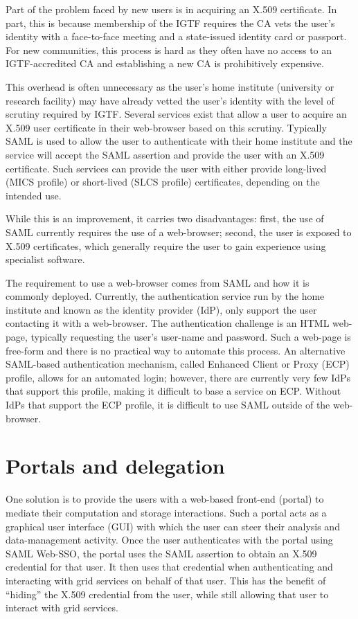 \documentclass[a4paper]{jpconf}
\begin{document}
Part of the problem faced by new users is in acquiring an X.509
certificate.  In part, this is because membership of the IGTF requires
the CA vets the user's identity with a face-to-face meeting and a
state-issued identity card or passport.  For new communities, this
process is hard as they often have no access to an IGTF-accredited CA
and establishing a new CA is prohibitively expensive.

This overhead is often unnecessary as the user's home institute
(university or research facility) may have already vetted the user's
identity with the level of scrutiny required by IGTF.  Several
services exist\cite{cilogon}\cite{tcs}\cite{dfn-aai} that allow a user
to acquire an X.509 user certificate in their web-browser based on
this scrutiny.  Typically SAML is used to allow the user to
authenticate with their home institute and the service will accept the
SAML assertion and provide the user with an X.509 certificate.  Such
services can provide the user with either provide long-lived (MICS
profile) or short-lived (SLCS profile) certificates, depending on the
intended use.

While this is an improvement, it carries two disadvantages: first, the
use of SAML currently requires the use of a web-browser; second, the
user is exposed to X.509 certificates, which generally require the
user to gain experience using specialist software.

The requirement to use a web-browser comes from SAML and how it is
commonly deployed.  Currently, the authentication service run by the
home institute and known as the identity provider (IdP), only support
the user contacting it with a web-browser.  The authentication
challenge is an HTML web-page, typically requesting the user's
user-name and password.  Such a web-page is free-form and there is no
practical way to automate this process.  An alternative SAML-based
authentication mechanism, called Enhanced Client or Proxy (ECP)
profile, allows for an automated login; however, there are currently
very few IdPs that support this profile, making it difficult to base a
service on ECP.  Without IdPs that support the ECP profile, it is
difficult to use SAML outside of the web-browser.

\section{Portals and delegation}

One solution is to provide the users with a web-based front-end
(portal) to mediate their computation and storage interactions.  Such
a portal acts as a graphical user interface (GUI) with which the user
can steer their analysis and data-management activity.  Once the user
authenticates with the portal using SAML Web-SSO, the portal uses the
SAML assertion to obtain an X.509 credential for that user.  It then
uses that credential when authenticating and interacting with grid
services on behalf of that user.  This has the benefit of ``hiding''
the X.509 credential from the user, while still allowing that user to
interact with grid services.
\end{document}
